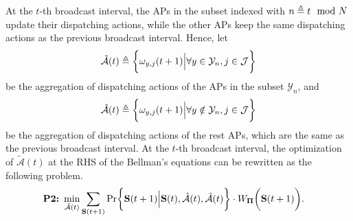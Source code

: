 At the $t$-th broadcast interval, the APs in the subset indexed with $n \triangleq t \mod{N}$ update their dispatching actions, while the other APs keep the same dispatching actions as the previous broadcast interval.
Hence, let
\begin{align}
    \tilde{\mathcal{A}}(t) \triangleq \bigg\{ {\omega}_{y,j}(t+1) \Big| \forall y\in\mathcal{Y}_{n},j\in\mathcal{J} \bigg\}
\end{align}
be the aggregation of dispatching actions of the APs in the subset $\mathcal{Y}_{n}$, and
\begin{align}
    \hat{\mathcal{A}}(t) \triangleq \bigg\{ {\omega}_{y,j}(t+1) \Big| \forall y\notin\mathcal{Y}_{n}, j\in\mathcal{J}\bigg\}
\end{align}
be the aggregation of dispatching actions of the rest APs, which are the same as the previous broadcast interval.
At the $t$-th broadcast interval, the optimization of $\tilde{\mathcal{A}}(t)$ at the RHS of the Bellman's equations can be rewritten as the following problem.
{\small
\begin{align}
    \textbf{P2:}~
    \min_{ \tilde{\mathcal{A}}(t) }
    &\sum_{\Stat(t+1)} \Pr\Brace{
        \Stat(t+1) \Big| \Stat(t), \hat{\mathcal{A}}(t), \tilde{\mathcal{A}}(t)
    } \cdot W_{\Baseline}\Paren{\Stat(t+1)}.
\end{align}
}

